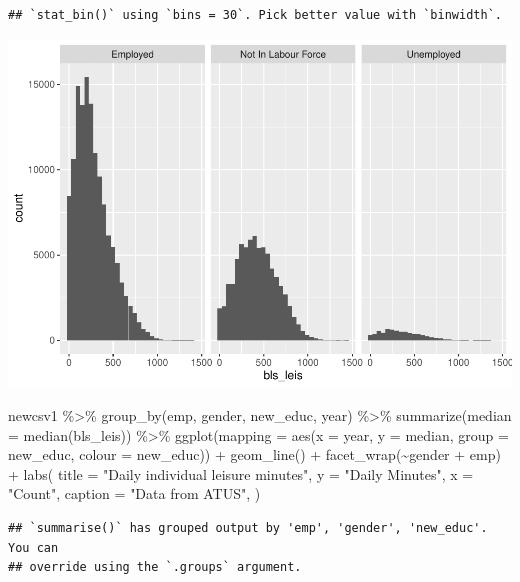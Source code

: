 \documentclass[
]{article}
\newenvironment{Shaded}{\begin{snugshade}}{\end{snugshade}}
\newcommand{\AttributeTok}[1]{\textcolor[rgb]{0.77,0.63,0.00}{#1}}
\newcommand{\FunctionTok}[1]{\textcolor[rgb]{0.00,0.00,0.00}{#1}}
\newcommand{\NormalTok}[1]{#1}
\newcommand{\SpecialCharTok}[1]{\textcolor[rgb]{0.00,0.00,0.00}{#1}}
\newcommand{\StringTok}[1]{\textcolor[rgb]{0.31,0.60,0.02}{#1}}
\begin{document}
\begin{verbatim}
## `stat_bin()` using `bins = 30`. Pick better value with `binwidth`.
\end{verbatim}

\includegraphics{Paper2_files/figure-latex/employment-2.pdf}

\begin{Shaded}
\begin{Highlighting}[]
\NormalTok{newcsv1 }\SpecialCharTok{\%\textgreater{}\%}
  \FunctionTok{group\_by}\NormalTok{(emp, gender, new\_educ, year) }\SpecialCharTok{\%\textgreater{}\%}
  \FunctionTok{summarize}\NormalTok{(}\AttributeTok{median =} \FunctionTok{median}\NormalTok{(bls\_leis)) }\SpecialCharTok{\%\textgreater{}\%}
  \FunctionTok{ggplot}\NormalTok{(}\AttributeTok{mapping =} \FunctionTok{aes}\NormalTok{(}\AttributeTok{x =}\NormalTok{ year, }\AttributeTok{y =}\NormalTok{ median, }\AttributeTok{group =}\NormalTok{ new\_educ, }\AttributeTok{colour =}\NormalTok{ new\_educ)) }\SpecialCharTok{+}
  \FunctionTok{geom\_line}\NormalTok{() }\SpecialCharTok{+}
  \FunctionTok{facet\_wrap}\NormalTok{(}\SpecialCharTok{\textasciitilde{}}\NormalTok{gender }\SpecialCharTok{+}\NormalTok{ emp) }\SpecialCharTok{+}
  \FunctionTok{labs}\NormalTok{(}
  \AttributeTok{title =} \StringTok{"Daily individual leisure minutes"}\NormalTok{,}
  \AttributeTok{y =} \StringTok{"Daily Minutes"}\NormalTok{,}
  \AttributeTok{x =} \StringTok{"Count"}\NormalTok{,}
  \AttributeTok{caption =} \StringTok{"Data from ATUS"}\NormalTok{,}
\NormalTok{)}
\end{Highlighting}
\end{Shaded}

\begin{verbatim}
## `summarise()` has grouped output by 'emp', 'gender', 'new_educ'. You can
## override using the `.groups` argument.
\end{verbatim}
\end{document}
